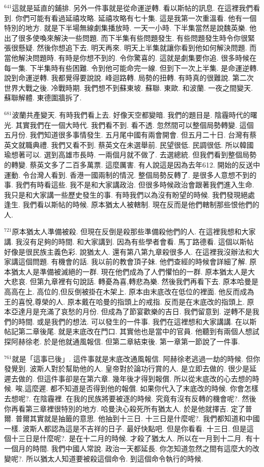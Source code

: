 \documentclass{book}
\begin{document}
$^{641}$這就是延直的鋪排.
另外一件事就是從命運逆轉.
看以斯帖的訊息.
在這裡我們看到.
你們可能有看過延禧攻略.
延禧攻略有七十集.
這是我第一次重溫看.
他有一個特別的地方.
就是下半場無線劇集播放時.
一天一小時.
下半集當然是說魏英樂.
他出了很多使喚來解決一些問題.
而下半集有些問題發生.
有些問題發生時令你很緊張很懸疑.
然後你想追下去.
明天再來.
明天上半集就讓你看到他如何解決問題.
而當他解決問題時.
有時是你想不到的.
令你驚喜的.
這就是劇集要你追.
很多時候在每一集.
下半集時有些困難.
令到他可能命完一線.
但到下一次上半集.
是命運逆轉.
說到命運逆轉.
我都覺得要說說.
峰迴路轉.
局勢的扭轉.
有時真的很難說.
第二次世界大戰之後.
冷戰時期.
我們想不到蘇東坡.
蘇聯.
東歐.
和波蘭.
一夜之間變天.
蘇聯解體.
東德圍牆拆了.

$^{681}$波蘭共產變天.
有時我們看上去.
好像天空都變暗.
我們的題目是.
陰霾時代的曙光.
其實我們在一個大時代.
我們看不到.
看不透.
忽然間可以整個局勢轉變.
這個五月份.
我們知道很多事情發生.
五月尾中國有兩會開會.
但五月二十日.
台灣有蔡英文就職典禮.
我們又看不到.
蔡英文在未選舉前.
民望很低.
民調很低.
所以韓國瑜想著可以.
選到高雄市長時.
一兩個月就不做了.
去選總統.
但我們看到整個局勢的轉變.
蔡英文多了二百多萬票.
這麼厲害.
有人說這是因為去年612.
開始的反送中運動.
令台灣人看到.
香港一國兩制的情況.
整個局勢反轉了.
是很多人意想不到的事.
我們有時看這些.
我不是和大家講政治.
但很多時候政治會跟著我們進入生命.
我只是和大家講一些歷史發生的事.
有時我們以為沒有盼望的時候.
我們發現絕處逢生.
我們看以斯帖的時候.
原本猶太人被轄制.
現在反而是他們轄制那些恨他們的人.

$^{721}$原本猶太人準備被殺.
但現在反倒是殺那些準備殺他們的人.
在這裡我想和大家講.
我沒有足夠的時間.
和大家講到.
因為有些學者會看.
馬丁路德看.
這個以斯帖好像是很民族主義色彩.
說猶太人.
還有第八第九章殺很多人.
在這裡我沒辦法和大家講這個問題.
有機會的話.
我以前的教會頂子妹.
他們查經的時候會詳細了解.
原本猶太人是準備被滅絕的一群.
現在他們成為了人們懼怕的一群.
原本猶太人是大大悲哀.
但第九章裡有句說話.
轉憂為喜,轉悲為樂.
然後我們再看下去.
原本哈曼是高高在上.
高位的,但反倒被掛在木架上.
原本由末底改在低位的裡面.
他反而成為王的喜悅,尊榮的人.
原本戴在哈曼的指頭上的戒指.
反而是在末底改的指頭上.
原本亞達月是充滿了哀愁的月份.
但成為了節宴歡樂的吉日.
我們留意到.
逆轉不是我們的時間.
或是我們的想法.
可以發生的一件事.
我們在這裡想和大家講講.
在以斯帖記第二章後尾.
就是末底改在門口.
其實他也是當中的官員.
他聽到有兩個人想試探阿赫徐老.
於是他就通風報信.
但第二章結束後.
第一章第一節說了一件事.

$^{761}$就是「這事已後」.
這件事就是末底改通風報信.
阿赫徐老逃過一劫的時候.
但你發覺到.
波斯人對於幫助他的人.
皇帝對於論功行賞的人.
是立即去做的.
很少是延遲去做的.
但這件事卻是在第六章.
幾年後才得到報償.
所以從末底改的心去想的時候.
唉,這麼遲.
都不知道是否得到他的報償.
如果你代入了末底改的時候.
你會怎樣去想呢?.
在陰霾裡.
在我的民族將要被逐的時候.
究竟有沒有反轉的機會呢?.
然後你再看第三章裡很特別的地方.
哈曼決心殺死所有猶太人.
於是他就擇吉.
定了普爾.
普爾其實就是抽籤的意思.
他抽到十三日.
十三日是什麼呢?.
我們都知道和中國一樣.
波斯人都認為這是不吉祥的日子.
最好快點吧.
但是你看看.
十三日.
但是這個十三日是什麼呢?.
是在十二月的時候.
才殺了猶太人.
所以在一月到十二月.
有十一個月的時間.
我們中國人常說.
政治一天都延長.
你怎知道忽然之間有這麼大的改變呢?.
所以猶太人知道要被殺這個命令.
到這個命令執行的時候.
\end{document}
